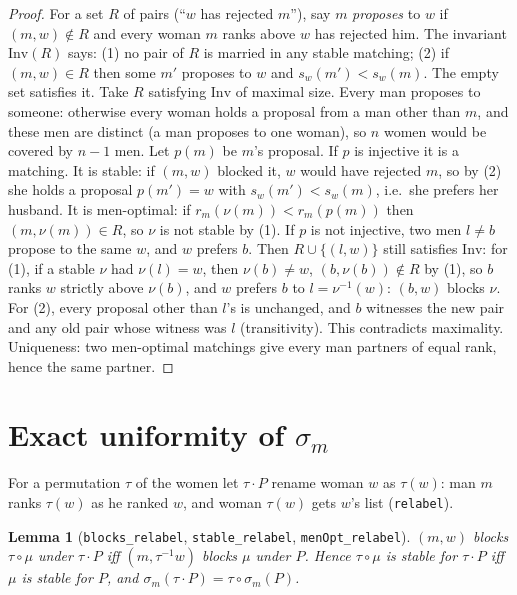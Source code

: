 \documentclass[11pt]{article}
\newtheorem{lemma}[theorem]{Lemma}
\theoremstyle{definition}
\begin{document}
\begin{proof}
For a set $R$ of pairs (``$w$ has rejected $m$''), say $m$ \emph{proposes} to $w$ if $(m,w)\notin R$ and every
woman $m$ ranks above $w$ has rejected him. The invariant $\mathrm{Inv}(R)$ says: (1) no pair of $R$ is married in
any stable matching; (2) if $(m,w)\in R$ then some $m'$ proposes to $w$ and $s_w(m')<s_w(m)$. The empty set
satisfies it. Take $R$ satisfying $\mathrm{Inv}$ of maximal size. Every man proposes to someone: otherwise every
woman holds a proposal from a man other than $m$, and these men are distinct (a man proposes to one woman), so
$n$ women would be covered by $n-1$ men. Let $p(m)$ be $m$'s proposal. If $p$ is injective it is a matching. It is
stable: if $(m,w)$ blocked it, $w$ would have rejected $m$, so by (2) she holds a proposal $p(m')=w$ with
$s_w(m')<s_w(m)$, i.e.\ she prefers her husband. It is men-optimal: if $r_m(\nu(m))<r_m(p(m))$ then
$(m,\nu(m))\in R$, so $\nu$ is not stable by (1). If $p$ is not injective, two men $l\ne b$ propose to the same $w$,
and $w$ prefers $b$. Then $R\cup\{(l,w)\}$ still satisfies $\mathrm{Inv}$: for (1), if a stable $\nu$ had
$\nu(l)=w$, then $\nu(b)\ne w$, $(b,\nu(b))\notin R$ by (1), so $b$ ranks $w$ strictly above $\nu(b)$, and $w$
prefers $b$ to $l=\nu^{-1}(w)$: $(b,w)$ blocks $\nu$. For (2), every proposal other than $l$'s is unchanged, and
$b$ witnesses the new pair and any old pair whose witness was $l$ (transitivity). This contradicts maximality.
Uniqueness: two men-optimal matchings give every man partners of equal rank, hence the same partner.
\end{proof}

\section{Exact uniformity of $\sigma_m$}

For a permutation $\tau$ of the women let $\tau\cdot P$ rename woman $w$ as $\tau(w)$: man $m$ ranks $\tau(w)$ as he
ranked $w$, and woman $\tau(w)$ gets $w$'s list (\texttt{relabel}).

\begin{lemma}[\texttt{blocks\_relabel}, \texttt{stable\_relabel}, \texttt{menOpt\_relabel}]
$(m,w)$ blocks $\tau\circ\mu$ under $\tau\cdot P$ iff $(m,\tau^{-1}w)$ blocks $\mu$ under $P$. Hence $\tau\circ\mu$
is stable for $\tau\cdot P$ iff $\mu$ is stable for $P$, and $\sigma_m(\tau\cdot P)=\tau\circ\sigma_m(P)$.
\end{lemma}
\end{document}
